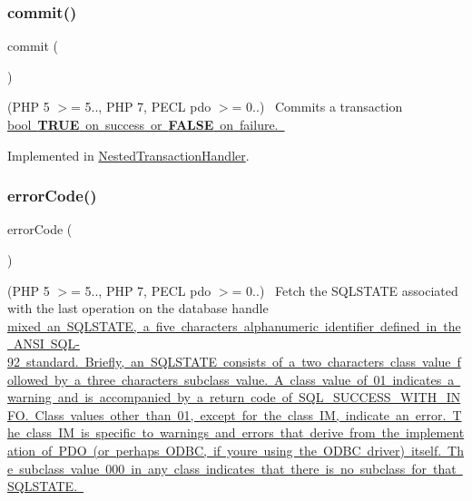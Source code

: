 \subsubsection{\texorpdfstring{commit()}{commit()}}
{\footnotesize\ttfamily commit (\begin{DoxyParamCaption}{ }\end{DoxyParamCaption})}

(P\+HP 5 $>$= 5.., P\+HP 7, P\+E\+CL pdo $>$= 0..)~\newline
 Commits a transaction \mbox{\hyperlink{}{bool {\bfseries T\+R\+UE} on success or {\bfseries F\+A\+L\+SE} on failure. }}

Implemented in \mbox{\hyperlink{class_pes_1_1_database_1_1_handler_1_1_nested_transaction_handler_af5674c27d4a92f6228565010eacbb9cb}{Nested\+Transaction\+Handler}}.

\mbox{\label{interface_pes_1_1_database_1_1_handler_1_1_p_d_o_interface_a928a98b280c4dd8971ce6998eb157409}} 
\subsubsection{\texorpdfstring{error\+Code()}{errorCode()}}
{\footnotesize\ttfamily error\+Code (\begin{DoxyParamCaption}{ }\end{DoxyParamCaption})}

(P\+HP 5 $>$= 5.., P\+HP 7, P\+E\+CL pdo $>$= 0..)~\newline
 Fetch the S\+Q\+L\+S\+T\+A\+TE associated with the last operation on the database handle \mbox{\hyperlink{}{mixed an S\+Q\+L\+S\+T\+A\+TE, a five characters alphanumeric identifier defined in the A\+N\+SI S\+Q\+L-\/92 standard. Briefly, an S\+Q\+L\+S\+T\+A\+TE consists of a two characters class value followed by a three characters subclass value. A class value of 01 indicates a warning and is accompanied by a return code of S\+Q\+L\+\_\+\+S\+U\+C\+C\+E\+S\+S\+\_\+\+W\+I\+T\+H\+\_\+\+I\+N\+FO. Class values other than \textquotesingle{}01\textquotesingle{}, except for the class \textquotesingle{}IM\textquotesingle{}, indicate an error. The class \textquotesingle{}IM\textquotesingle{} is specific to warnings and errors that derive from the implementation of P\+DO (or perhaps O\+D\+BC, if you\textquotesingle{}re using the O\+D\+BC driver) itself. The subclass value \textquotesingle{}000\textquotesingle{} in any class indicates that there is no subclass for that S\+Q\+L\+S\+T\+A\+TE. }} 

